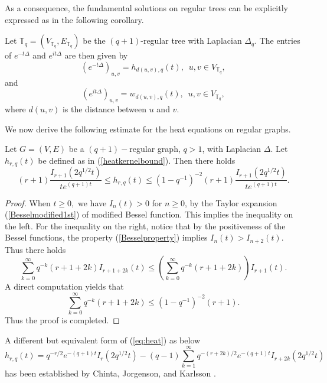 \documentclass{article}
\begin{document}
As a consequence, the fundamental solutions on regular trees can be explicitly expressed as in the following corollary. 


\begin{corollary}\label{heattree}
Let $\mathbb{T}_q=(V_{\mathbb{T}_q}, E_{\mathbb{T}_q})$ be the $(q+1)$-regular tree with Laplacian $\Delta_q$. The entries of $e^{-t\Delta}$ and $e^{it\Delta}$ are then given by 
\begin{equation}
    \left( e^{-t\Delta} \right)_{u,v}=h_{d(u,v),q}(t), \,\,\,u,v \in V_{\mathbb{T}_q},
\end{equation}
and 
\begin{equation}
    \left( e^{it\Delta} \right)_{u,v}=w_{d(u,v),q}(t),\,\,\,u,v \in V_{\mathbb{T}_q},
\end{equation}
where $d(u,v)$ is the distance between $u$ and $v$.
\end{corollary}


We now derive the following estimate for the heat equations on regular graphs.
\begin{proposition}\label{coefficientofeq}
Let $G=(V,E)$ be a $(q+1)-$regular graph, $q>1$, with Laplacian $\Delta$. Let $h_{r,q}(t)$ be defined as in (\ref{heatkernelbound}). Then there holds 
 $$(r+1)\frac{I_{r+1}(2q^{1/2}t)}{te^{(q+1)t}} \leq h_{r,q}(t)\leq (1-q^{-1})^{-2}(r+1)\frac{I_{r+1}(2q^{1/2}t)}{te^{(q+1)t}}.$$
\end{proposition}
\begin{proof}
    When $t\geq 0,$ we have $I_n(t)>0$ for $n\geq 0$, by the Taylor expansion (\ref{Besselmodified1st}) of modified Bessel function. This implies the inequality on the left. For the inequality on the right, notice that by the positiveness of the Bessel functions, the property (\ref{Besselproperty}) implies $I_n(t)>I_{n+2}(t)$. Thus there holds
    $$\sum_{k=0}^{\infty}
   q^{-k}(r+1+2k)I_{r+1+2k}(t)\leq \left(\sum_{k=0}^{\infty}
   q^{-k}(r+1+2k)\right)I_{r+1}(t).$$
   A direct computation yields that
   $$\sum_{k=0}^{\infty}
   q^{-k}(r+1+2k)\leq (1-q^{-1})^{-2}(r+1).$$
   Thus the proof is completed.
\end{proof}


\begin{remark}
    A different but equivalent form of (\ref{eq:heat}) as below 
    \begin{equation*}
        h_{r,q}(t)=q^{-r/2}e^{-(q+1)t}I_r(2q^{1/2}t)-(q-1)\sum_{k=1}^{\infty}q^{-(r+2k)/2}e^{-(q+1)t}I_{r+2k}(2q^{1/2}t)
    \end{equation*}
    has been established by Chinta, Jorgenson, and Karlsson \cite{CJK15}. 
\end{remark}
\end{document}
